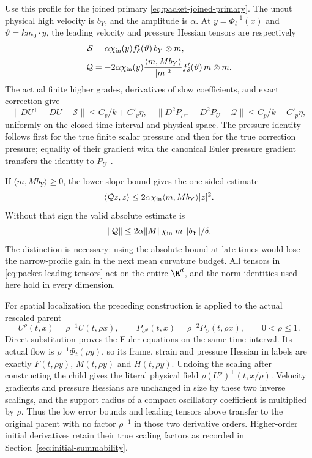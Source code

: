 Use this profile for the joined primary \eqref{eq:packet-joined-primary}.
The uncut physical high velocity is $b_Y$, and the amplitude is $\alpha$.
At
$y=\Phi_t^{-1}(x)$ and $\vartheta=km_0\cdot y$, the leading velocity
and pressure Hessian tensors are respectively
\begin{align}
 \mathcal S&=\alpha\chi_{\rm in}(y)f_\delta'(\vartheta)\,
                   b_Y\otimes m,\notag\\
 \mathcal Q&=-2\alpha\chi_{\rm in}(y)
       \frac{\langle m,Mb_Y\rangle}{|m|^2}
       f_\delta'(\vartheta)\,m\otimes m.
                                                        \label{eq:packet-leading-tensors}
\end{align}
The actual finite higher grades, derivatives of slow coefficients, and
exact correction give
\begin{equation}\label{eq:packet-low-errors}
 \|DU^+-DU-\mathcal S\|\le C_v/k+C'_v\eta,
 \quad
 \|D^2P_{U^+}-D^2P_U-\mathcal Q\|\le C_p/k+C'_p\eta,
\end{equation}
uniformly on the closed time interval and physical space. The pressure
identity follows first for the true finite scalar pressure and then for
the true correction pressure; equality of their gradient with the
canonical Euler pressure gradient transfers the identity to
$P_{U^+}$.

If $\langle m,Mb_Y\rangle\ge0$, the lower slope bound gives the one-sided
estimate
\begin{equation}\label{eq:packet-signed-curvature}
 \langle\mathcal Qz,z\rangle
 \le2\alpha\chi_{\rm in}\langle m,Mb_Y\rangle |z|^2.
\end{equation}
Without that sign the valid absolute estimate is
\[
 \|\mathcal Q\|\le
   2\alpha\|M\|\chi_{\rm in}|m|\,|b_Y|/\delta.
\]
The distinction is necessary: using the absolute bound at late times
would lose the narrow-profile gain in the next mean curvature budget.
All tensors in \eqref{eq:packet-leading-tensors} act on the entire
$\R^d$, and the norm identities used here hold in every dimension.

For spatial localization the preceding construction is applied to the
actual rescaled parent
\[
 U^\rho(t,x)=\rho^{-1}U(t,\rho x),\qquad
 P_{U^\rho}(t,x)=\rho^{-2}P_U(t,\rho x),\qquad 0<\rho\le1.
\]
Direct substitution proves the Euler equations on the same time interval.
Its actual flow is $\rho^{-1}\Phi_t(\rho y)$, so its frame, strain and
pressure Hessian in labels are exactly $F(t,\rho y)$,
$M(t,\rho y)$ and $H(t,\rho y)$. Undoing the scaling after constructing
the child gives the literal physical field
$\rho(U^\rho)^+(t,x/\rho)$. Velocity gradients and pressure Hessians
are unchanged in size by these two inverse scalings, and the support
radius of a compact oscillatory coefficient is multiplied by $\rho$.
Thus the low error bounds and leading tensors above transfer to the
original parent with no factor $\rho^{-1}$ in those two derivative
orders. Higher-order initial derivatives retain their true scaling
factors as recorded in Section~\ref{sec:initial-summability}.

